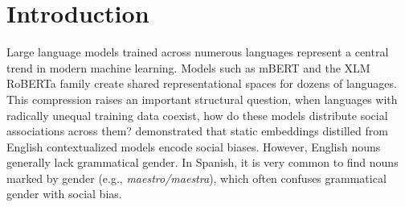 \documentclass[english, a4paper, 11.5pt, twoside]{article}
\begin{document}

%
\newpage

\newpage


\begin{abstract}
Multilingual foundation models represent a central trend in modern machine learning, yet pretraining across massive corpora often encodes social biases. While previous studies have demonstrated that static embeddings distilled from contextualized models encode gender bias in English, Spanish presents a particular challenge as most professions are morphologically gender marked, confusing grammatical gender with social bias. 

This study evaluates how static embeddings extracted from multilingual models assign gender bias to grammatically invariant Spanish professions (e.g., \textit{dentista}, \textit{taxista}) without explicit supervision. Comparative analysis is conducted
across Arabic and Tigrina. 

Using geometric test across multiple architectures, we demonstrate that while models successfully encode the grammatical neutrality of certain suffixes, statistical frequency and societal bias override morphological rules for fields historically dominated by men. Finally, our results demonstrate that the internal design of the model also has an influence on bias direction. 


\end{abstract}

\section{Introduction}\label{section-introduction}
Large language models trained across numerous languages represent a central trend in modern machine learning. Models such as mBERT and the XLM RoBERTa family create shared representational spaces for dozens of languages. This compression raises an important structural question, when languages with radically unequal training data coexist, how do these models distribute social associations across them? \textcite{Bommasani:2020} demonstrated that static embeddings distilled from English contextualized models encode social biases. However, English nouns generally lack grammatical gender. In Spanish, it is very common to find nouns marked by gender (e.g., \textit{maestro/maestra}), which often confuses grammatical gender with social bias.
\end{document}
